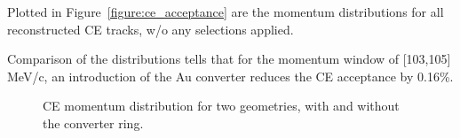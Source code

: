 Plotted in Figure~\ref{figure:ce_acceptance} are the momentum distributions for all
reconstructed CE tracks, w/o any selections applied. 

Comparison of the distributions tells that for the momentum window of [103,105] MeV/c,
an introduction of the Au converter reduces the CE acceptance by 0.16\%.

\begin{figure}[H]
  \caption{
    \label{figure:ce_acceptance}
    CE momentum distribution for two geometries, with and without the converter ring. 
  }
  \label{figure:ce_momentum_tsda}
\end{figure}

